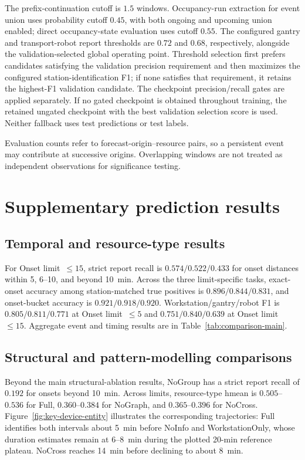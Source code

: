 \documentclass[a4paper,fleqn]{cas-dc}
\begin{document}
The prefix-continuation cutoff is $1.5$ windows. Occupancy-run extraction for event union uses probability cutoff $0.45$, with both ongoing and upcoming union enabled; direct occupancy-state evaluation uses cutoff $0.55$. The configured gantry and transport-robot report thresholds are $0.72$ and $0.68$, respectively, alongside the validation-selected global operating point. Threshold selection first prefers candidates satisfying the validation precision requirement and then maximizes the configured station-identification F1; if none satisfies that requirement, it retains the highest-F1 validation candidate. The checkpoint precision/recall gates are applied separately. If no gated checkpoint is obtained throughout training, the retained ungated checkpoint with the best validation selection score is used. Neither fallback uses test predictions or test labels.

Evaluation counts refer to forecast-origin--resource pairs, so a persistent event may contribute at successive origins. Overlapping windows are not treated as independent observations for significance testing.

\section{Supplementary prediction results}\label{app:supplementary-results}

\subsection{Temporal and resource-type results}



For Onset limit~$\leq15$, strict report recall is $0.574/0.522/0.433$ for onset distances within 5, 6--10, and beyond 10~min. Across the three limit-specific tasks, exact-onset accuracy among station-matched true positives is $0.896/0.844/0.831$, and onset-bucket accuracy is $0.921/0.918/0.920$. Workstation/gantry/robot F1 is $0.805/0.811/0.771$ at Onset limit~$\leq5$ and $0.751/0.840/0.639$ at Onset limit~$\leq15$. Aggregate event and timing results are in Table~\ref{tab:comparison-main}.

\subsection{Structural and pattern-modelling comparisons}

Beyond the main structural-ablation results, NoGroup has a strict report recall of $0.192$ for onsets beyond 10~min. Across limits, resource-type hmean is $0.505$--$0.536$ for Full, $0.360$--$0.384$ for NoGraph, and $0.365$--$0.396$ for NoCross. Figure~\ref{fig:key-device-entity} illustrates the corresponding trajectories: Full identifies both intervals about 5~min before NoInfo and WorkstationOnly, whose duration estimates remain at 6--8~min during the plotted 20-min reference plateau. NoCross reaches 14~min before declining to about 8~min.
\end{document}
